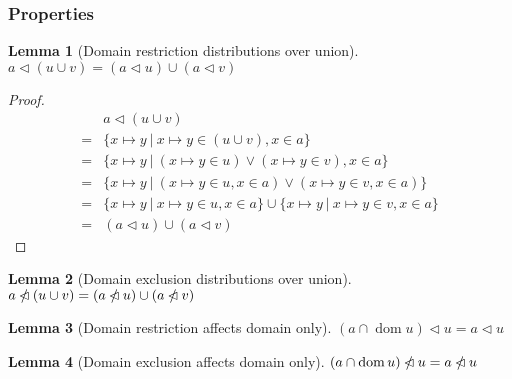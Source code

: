 \documentclass{article}
\newcommand{\restrictdom}{\lhd}
\newcommand{\subtractdom}{\mathbin{\slashed{\restrictdom}}}
\DeclareMathOperator{\dom}{dom}
\newtheorem{lemma}{Lemma}
\begin{document}
\subsubsection{Properties}

\begin{lemma}[Domain restriction distributions over union]
\begin{math}
a \restrictdom (u \cup v) = (a \restrictdom u) \cup (a \restrictdom v)
\end{math}
\label{lem:restrictdom_union}
\end{lemma}

\begin{proof}
\begin{equation*}
\begin{split}
& a \restrictdom (u \cup v) \\
= & \{ x \mapsto y ~|~ x \mapsto y \in (u \cup v), x \in a \} \\
= & \{ x \mapsto y ~|~ (x \mapsto y \in u) \vee (x \mapsto y \in v), x \in a \} \\
= & \{ x \mapsto y ~|~ (x \mapsto y \in u, x \in a) \vee (x \mapsto y \in v, x \in a) \} \\
= & \{ x \mapsto y ~|~ x \mapsto y \in u, x \in a \} \cup \{ x \mapsto y ~|~ x \mapsto y \in v, x \in a \} \\
= & (a \restrictdom u) \cup (a \restrictdom v)
\end{split}
\end{equation*}
\end{proof}

\begin{lemma}[Domain exclusion distributions over union]
\begin{math}
a \subtractdom (u \cup v) = (a \subtractdom u) \cup (a \subtractdom v)
\end{math}
\label{lem:subtractdom_union}
\end{lemma}

\begin{lemma}[Domain restriction affects domain only]
\begin{math}
(a \cap \dom u) \restrictdom u = a \restrictdom u
\end{math}
\label{lem:restrictdom_dom}
\end{lemma}

\begin{lemma}[Domain exclusion affects domain only]
\begin{math}
(a \cap \dom u) \subtractdom u = a \subtractdom u
\end{math}
\label{lem:subtractdom_dom}
\end{lemma}
\end{document}
